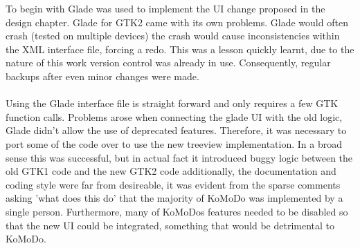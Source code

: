     To begin with Glade was used to implement the UI change proposed in the design chapter. Glade for GTK2 came with its own problems. Glade would often crash (tested on multiple devices) the crash would cause inconsistencies within the XML interface file, forcing a redo. This was a lesson quickly learnt, due to the nature of this work version control was already in use. Consequently, regular backups after even minor changes were made.\\\\
    Using the Glade interface file is straight forward and only requires a few GTK function calls. Problems arose when connecting the glade UI with the old logic, Glade didn't allow the use of deprecated features. Therefore, it was necessary to port some of the code over to use the new treeview implementation. In a broad sense this was successful, but in actual fact it introduced buggy logic between the old GTK1 code and the new GTK2 code additionally, the documentation and coding style were far from desireable, it was evident from the sparse comments asking 'what does this do' that the majority of KoMoDo was implemented by a single person. Furthermore, many of KoMoDos features needed to be disabled so that the new UI could be integrated, something that would be detrimental to KoMoDo. 
